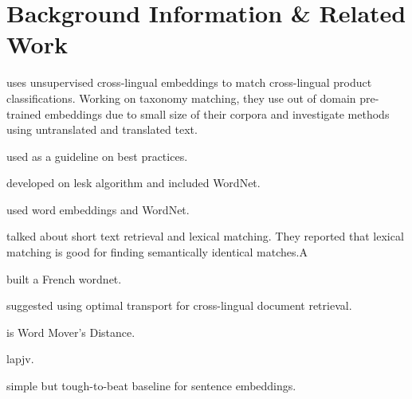 
\chapter{Background Information \& Related Work}\label{chap:background_n_related}

\textcite{gordeev_unsupervised_2018} uses unsupervised cross-lingual embeddings to match cross-lingual product classifications.
Working on taxonomy matching, they use out of domain pre-trained embeddings due to small size of their corpora %
and investigate methods using untranslated and translated text.

\textcite{irvine_comprehensive_2017} used as a guideline on best practices.

\textcite{banerjee_adapted_2002} developed on lesk algorithm and included WordNet.

\textcite{khodak_automated_2017} used word embeddings and WordNet.

\textcite{metzler_similarity_2007} talked about short text retrieval and lexical matching. They reported that lexical matching is good for finding semantically identical matches.A

\textcite{sagot_building_2008} built a French wordnet.

\textcite{balikas_cross-lingual_2018-1} suggested using optimal transport for cross-lingual document retrieval.

\textcite{kusner_word_2015-2} is Word Mover's Distance.

\textcite{jonker_shortest_1987} lapjv.

\textcite{arora_simple_2016} simple but tough-to-beat baseline for sentence embeddings.
